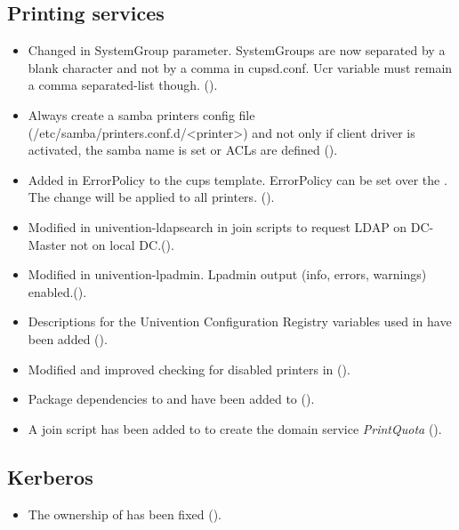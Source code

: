 \subsection{Printing services}
\begin{itemize}
\item Changed in  SystemGroup parameter. SystemGroups are now separated by a blank character and not by a comma in cupsd.conf. Ucr variable must remain a comma separated-list though. ().

\item Always create a samba printers config file
(/etc/samba/printers.conf.d/<printer>) and not only if client driver is
activated, the samba name is set or ACLs are defined ().

\item Added in  ErrorPolicy to the cups template. ErrorPolicy can be set over the . The change will be applied to all printers. ().

\item Modified in  univention-ldapsearch in join scripts to request LDAP on DC-Master not on local DC.().

\item Modified in  univention-lpadmin. Lpadmin output (info, errors, warnings) enabled.().

\item Descriptions for the Univention Configuration Registry variables used in  have been added ().

\item Modified and improved checking for disabled printers in   ().

\item Package dependencies to  and  have been added to  ().

\item A join script has been added to  to
create the domain service \emph{PrintQuota} ().

\end{itemize}

\subsection{Kerberos}
\begin{itemize}
\item The ownership of  has been fixed ().
\end{itemize}

